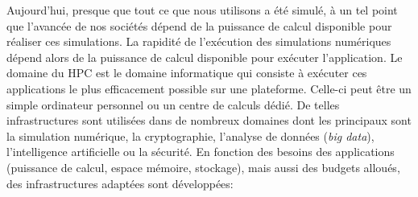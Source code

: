         
    Aujourd'hui, presque que tout ce que nous utilisons a été simulé, à un tel point que l’avancée de nos sociétés dépend de la puissance de calcul disponible pour réaliser ces simulations. La rapidité de l'exécution des simulations numériques dépend alors de la puissance de calcul disponible pour exécuter l’application. Le domaine du \gls{HPC} est le domaine informatique qui consiste à exécuter ces applications le plus efficacement possible sur une plateforme. Celle-ci peut être un simple ordinateur personnel ou un centre de calculs dédié. De telles infrastructures sont utilisées dans de nombreux domaines dont les principaux sont la simulation numérique, la cryptographie, l'analyse de données (\textit{big data}), l’intelligence artificielle ou la sécurité. En fonction des besoins des applications (puissance de calcul, espace mémoire, stockage), mais aussi des budgets alloués, des infrastructures adaptées sont développées:
    
